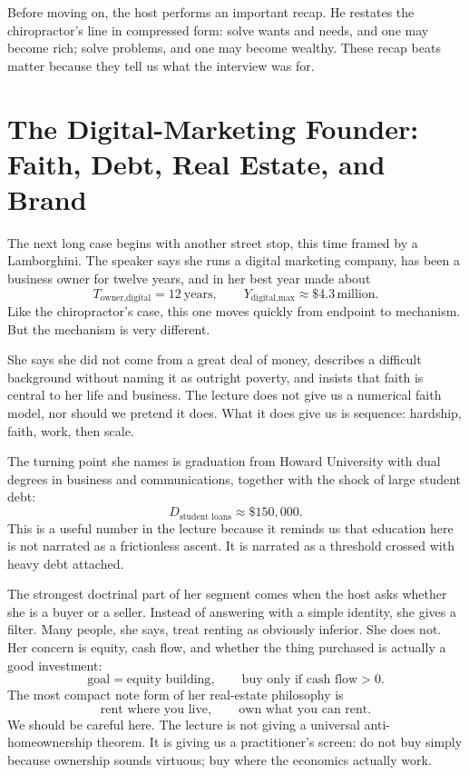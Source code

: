 Before moving on, the host performs an important recap. He restates the chiropractor's line in compressed form: solve wants and needs, and one may become rich; solve problems, and one may become wealthy. These recap beats matter because they tell us what the interview was for.

\section{The Digital-Marketing Founder: Faith, Debt, Real Estate, and Brand}

The next long case begins with another street stop, this time framed by a Lamborghini. The speaker says she runs a digital marketing company, has been a business owner for twelve years, and in her best year made about
\begin{equation}
T_{\text{owner,digital}} = 12\ \text{years},\qquad
Y_{\text{digital,max}} \approx \$4.3\,\text{million}.
\end{equation}
Like the chiropractor's case, this one moves quickly from endpoint to mechanism. But the mechanism is very different.

She says she did not come from a great deal of money, describes a difficult background without naming it as outright poverty, and insists that faith is central to her life and business. The lecture does not give us a numerical faith model, nor should we pretend it does. What it does give us is sequence: hardship, faith, work, then scale.

The turning point she names is graduation from Howard University with dual degrees in business and communications, together with the shock of large student debt:
\begin{equation}
D_{\text{student loans}} \approx \$150{,}000.
\end{equation}
This is a useful number in the lecture because it reminds us that education here is not narrated as a frictionless ascent. It is narrated as a threshold crossed with heavy debt attached.

The strongest doctrinal part of her segment comes when the host asks whether she is a buyer or a seller. Instead of answering with a simple identity, she gives a filter. Many people, she says, treat renting as obviously inferior. She does not. Her concern is equity, cash flow, and whether the thing purchased is actually a good investment:
\begin{equation}
\text{goal} = \text{equity building},
\qquad
\text{buy only if } \text{cash flow} > 0.
\end{equation}
The most compact note form of her real-estate philosophy is
\begin{equation}
\text{rent where you live},\qquad
\text{own what you can rent}.
\end{equation}
We should be careful here. The lecture is not giving a universal anti-homeownership theorem. It is giving us a practitioner's screen: do not buy simply because ownership sounds virtuous; buy where the economics actually work.

